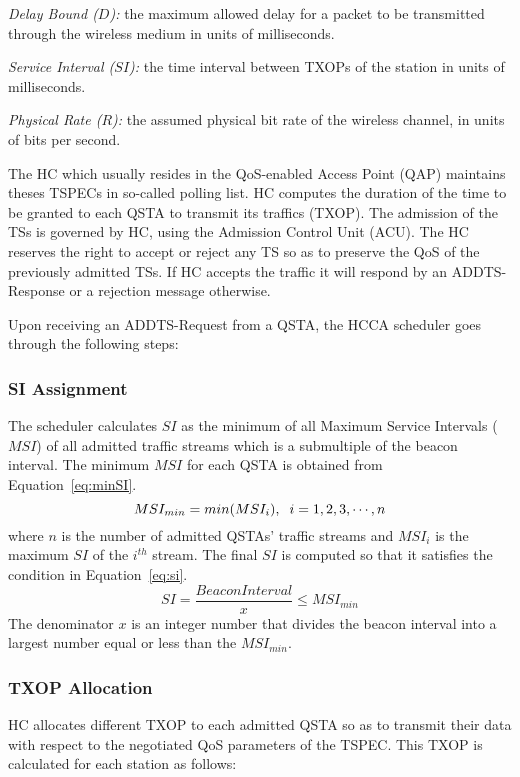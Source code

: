 \documentclass[a4paper, conference]{IEEEtran}
\begin{document}
\textit{Delay Bound ($D$):} the maximum allowed delay for a packet to be transmitted through the wireless medium in units of milliseconds.

\textit{Service Interval ($SI$):} the time interval between TXOPs of the station in units of milliseconds.

\textit{Physical Rate ($R$):}  the assumed physical bit rate of the wireless channel, in units of bits per second.

The HC which usually resides in the QoS-enabled Access Point (QAP) maintains theses TSPECs in so-called polling list. HC computes the duration of the time to be granted to each QSTA to transmit its traffics (TXOP). The admission of the TSs is governed by HC, using the Admission Control Unit (ACU). The HC reserves the right to accept or reject any TS so as to preserve the QoS of the previously admitted TSs. If HC accepts the traffic it will respond by an ADDTS-Response or a rejection message otherwise.

Upon receiving an ADDTS-Request from a QSTA, the HCCA scheduler goes through the following steps:
\subsubsection{SI Assignment}
\label{eq:SIassign}
The scheduler calculates $SI$ as the minimum of all Maximum Service Intervals ($MSI$) of all admitted traffic streams which is a submultiple of the beacon interval. The minimum $MSI$ for each QSTA is obtained from Equation~\eqref{eq:minSI}.
\begin{equation}
\label{eq:minSI}
MSI_{min} = min(MSI_{i}), \hspace{2mm} i =1,2,3, \cdotp\cdotp\cdotp, n
\end{equation}
where $n$ is the number of admitted QSTAs' traffic streams and $MSI_{i}$ is the maximum $SI$ of the $i^{th}$ stream.
The final $SI$ is computed so that it satisfies the condition in Equation~\eqref{eq:si}.
\begin{equation}
\label{eq:si}
SI = \frac{BeaconInterval}{x} \leq  MSI_{min}
\end{equation}
The denominator $x$ is an integer number that divides the beacon interval into a largest number equal or less than the $MSI_{min}$.

\subsubsection{TXOP Allocation}
HC allocates different TXOP to each admitted QSTA so as to transmit their data with respect to the negotiated QoS parameters of the TSPEC. This TXOP is calculated for each station as follows:
\end{document}
